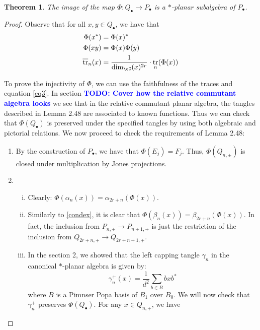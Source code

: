 \documentclass[11pt]{article}
\theoremstyle{plain}
\newtheorem{thm}{Theorem}[section]
\theoremstyle{definition}
\DeclareMathOperator{\tr}{tr}
\newcommand{\todo}[1]{\textcolor{blue}{\textbf{TODO: #1}}}
\begin{document}
\begin{thm}
The image of the map $\Phi:Q_{\bullet} \to P_{\bullet}$ is a $\ast$-planar subalgebra of $P_{\bullet}$.
\end{thm} 

\begin{proof}
Observe that for all $x,y \in Q_{\bullet}$, we have that 
\begin{align}
	\Phi(x^{*}) &= \Phi(x)^{\ast} \\
	\Phi(xy) &= \Phi(x)\Phi(y) \\
	\overline{\tr}_{n}(x) &= \frac{1}{\dim_\cC(x)^{2r}}\cdot\tr_{n}(\Phi(x)) \label{eq3}
\end{align}

	To prove the injectivity of $\Phi$, we can use the faithfulness of the traces and equation \eqref{eq3}.
	In section \todo{Cover how the relative commutant algebra looks} we see that in the relative commutant planar algebra, the tangles described in Lemma 2.48 are associated to known functions. Thus we can check that $\Phi(Q_\bullet)$ is preserved under the specified tangles by using both algebraic and pictorial relations. We now proceed to check the requirements of Lemma 2.48:
\begin{enumerate}[(1)]
\item By the construction of $P_{\bullet}$, we have that $\Phi(E_j)=F_j$. Thus, $\Phi(Q_{n,\pm})$ is closed under multiplication by Jones projections. 
\item \begin{enumerate}[(i)]
\item \label{condex} Clearly: $\Phi(\alpha_n(x)) = \alpha_{2r+n}(\Phi(x))$.
\item Similarly to \eqref{condex}, it is clear that $\Phi(\beta_n(x)) = \beta_{2r+n}(\Phi(x))$. In fact, the inclusion from $P_{n,+} \to P_{n+1,+}$ is just the restriction of the inclusion from $Q_{2r+n,+} \to Q_{2r+n+1,+}$. 
\item In the section 2, %
 we showed that the left capping tangle $\gamma_n$ in the canonical $*$-planar algebra is given by:
\[
 \gamma^{+}_n(x) = \frac{1}{d^2}\sum_{b \in B}bxb^\ast
\]
where $B$ is a Pimnser Popa basis of $B_1$ over $B_0$. We will now check that $\gamma^{+}_n$ preserves $\Phi(Q_{\bullet})$. For any $x \in Q_{n,+}$, we have 


\end{enumerate}
\end{enumerate}
\end{proof}
\end{document}
